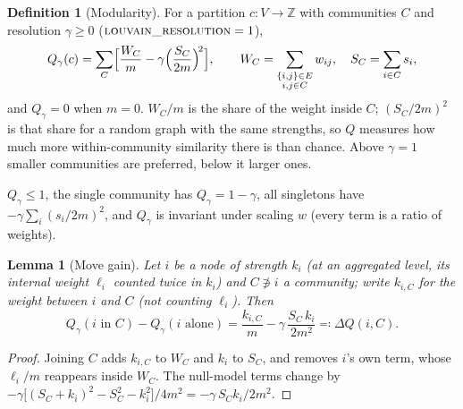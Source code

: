 \documentclass[11pt]{article}
\theoremstyle{plain}
\newtheorem{lemma}[theorem]{Lemma}
\theoremstyle{definition}
\newtheorem{definition}[theorem]{Definition}
\theoremstyle{remark}
\begin{document}
\begin{definition}[Modularity]\label{def:modularity}
For a partition $c : V \to \mathbb{Z}$ with communities $C$ and resolution $\gamma \ge 0$ ($\textsc{louvain\_resolution} = 1$),
\begin{equation}\label{eq:modularity}
Q_\gamma(c) = \sum_{C} \Bigl[ \frac{W_C}{m} - \gamma \Bigl( \frac{S_C}{2m} \Bigr)^{\!2} \Bigr], \qquad W_C = \sum_{\substack{\{i,j\} \in E\\ i, j \in C}} w_{ij}, \quad S_C = \sum_{i \in C} s_i,
\end{equation}
and $Q_\gamma = 0$ when $m = 0$. $W_C / m$ is the share of the weight inside $C$; $(S_C/2m)^2$ is that share for a random graph with the same strengths, so $Q$ measures how much more within-community similarity there is than chance. Above $\gamma = 1$ smaller communities are preferred, below it larger ones.
\end{definition}

$Q_\gamma \le 1$, the single community has $Q_\gamma = 1 - \gamma$, all singletons have $-\gamma \sum_i (s_i/2m)^2$, and $Q_\gamma$ is invariant under scaling $w$ (every term is a ratio of weights).

\begin{lemma}[Move gain]\label{lem:gain}
Let $i$ be a node of strength $k_i$ (at an aggregated level, its internal weight $\ell_i$ counted twice in $k_i$) and $C \not\ni i$ a community; write $k_{i,C}$ for the weight between $i$ and $C$ (not counting $\ell_i$). Then
\begin{equation}\label{eq:louvaingain}
Q_\gamma(i \text{ in } C) - Q_\gamma(i \text{ alone}) = \frac{k_{i,C}}{m} - \gamma\, \frac{S_C\, k_i}{2m^2} \eqqcolon \Delta Q(i, C).
\end{equation}
\end{lemma}
\begin{proof}
Joining $C$ adds $k_{i,C}$ to $W_C$ and $k_i$ to $S_C$, and removes $i$'s own term, whose $\ell_i/m$ reappears inside $W_C$. The null-model terms change by $-\gamma \bigl[(S_C + k_i)^2 - S_C^2 - k_i^2\bigr]/4m^2 = -\gamma\, S_C k_i / 2m^2$.
\end{proof}
\end{document}
